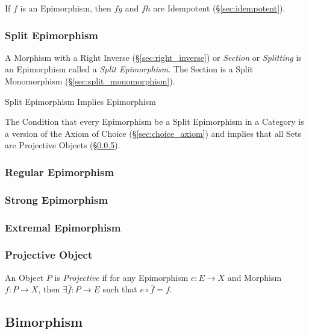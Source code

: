 If $f$ is an Epimorphism, then $fg$ and $fh$ are Idempotent
(\S\ref{sec:idempotent}). %



\subsubsection{Split Epimorphism}\label{sec:split_epimorphism}

A Morphism with a Right Inverse (\S\ref{sec:right_inverse}) or
\emph{Section} or \emph{Splitting} is an Epimorphism called a
\emph{Split Epimorphism}. The Section is a Split Monomorphism
(\S\ref{sec:split_monomorphism}).

Split Epimorphism Implies Epimorphism

The Condition that every Epimorphism be a Split Epimorphism in a
Category is a version of the Axiom of Choice
(\S\ref{sec:choice_axiom}) and implies that all Sets are Projective
Objects (\S\ref{sec:projective_object}).\cite{awodey06}



\subsubsection{Regular Epimorphism}\label{sec:regular_epimorphism}

\subsubsection{Strong Epimorphism}\label{sec:strong_epimorphism}

\subsubsection{Extremal Epimorphism}\label{sec:extremal_epimorphism}

\subsubsection{Projective Object}\label{sec:projective_object}

An Object $P$ is \emph{Projective} if for any Epimorphism $e : E
\rightarrow X$ and Morphism $f : P \rightarrow X$, then $\exists
\overline{f} : P \rightarrow E$ such that $e \circ \overline{f} = f$.



\subsection{Bimorphism}\label{sec:bimorphism}

